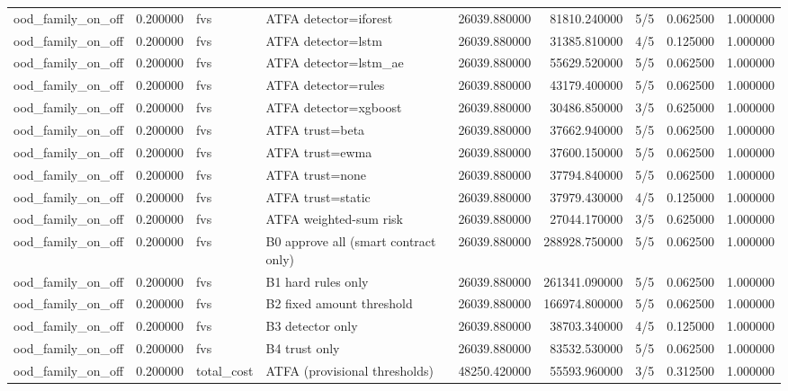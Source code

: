 \begin{tabular}{lrllrrlrr}
ood\_family\_on\_off & 0.200000 & fvs & ATFA detector=iforest & 26039.880000 & 81810.240000 & 5/5 & 0.062500 & 1.000000 \\
ood\_family\_on\_off & 0.200000 & fvs & ATFA detector=lstm & 26039.880000 & 31385.810000 & 4/5 & 0.125000 & 1.000000 \\
ood\_family\_on\_off & 0.200000 & fvs & ATFA detector=lstm\_ae & 26039.880000 & 55629.520000 & 5/5 & 0.062500 & 1.000000 \\
ood\_family\_on\_off & 0.200000 & fvs & ATFA detector=rules & 26039.880000 & 43179.400000 & 5/5 & 0.062500 & 1.000000 \\
ood\_family\_on\_off & 0.200000 & fvs & ATFA detector=xgboost & 26039.880000 & 30486.850000 & 3/5 & 0.625000 & 1.000000 \\
ood\_family\_on\_off & 0.200000 & fvs & ATFA trust=beta & 26039.880000 & 37662.940000 & 5/5 & 0.062500 & 1.000000 \\
ood\_family\_on\_off & 0.200000 & fvs & ATFA trust=ewma & 26039.880000 & 37600.150000 & 5/5 & 0.062500 & 1.000000 \\
ood\_family\_on\_off & 0.200000 & fvs & ATFA trust=none & 26039.880000 & 37794.840000 & 5/5 & 0.062500 & 1.000000 \\
ood\_family\_on\_off & 0.200000 & fvs & ATFA trust=static & 26039.880000 & 37979.430000 & 4/5 & 0.125000 & 1.000000 \\
ood\_family\_on\_off & 0.200000 & fvs & ATFA weighted-sum risk & 26039.880000 & 27044.170000 & 3/5 & 0.625000 & 1.000000 \\
ood\_family\_on\_off & 0.200000 & fvs & B0 approve all (smart contract only) & 26039.880000 & 288928.750000 & 5/5 & 0.062500 & 1.000000 \\
ood\_family\_on\_off & 0.200000 & fvs & B1 hard rules only & 26039.880000 & 261341.090000 & 5/5 & 0.062500 & 1.000000 \\
ood\_family\_on\_off & 0.200000 & fvs & B2 fixed amount threshold & 26039.880000 & 166974.800000 & 5/5 & 0.062500 & 1.000000 \\
ood\_family\_on\_off & 0.200000 & fvs & B3 detector only & 26039.880000 & 38703.340000 & 4/5 & 0.125000 & 1.000000 \\
ood\_family\_on\_off & 0.200000 & fvs & B4 trust only & 26039.880000 & 83532.530000 & 5/5 & 0.062500 & 1.000000 \\
ood\_family\_on\_off & 0.200000 & total\_cost & ATFA (provisional thresholds) & 48250.420000 & 55593.960000 & 3/5 & 0.312500 & 1.000000 \\

\end{tabular}
